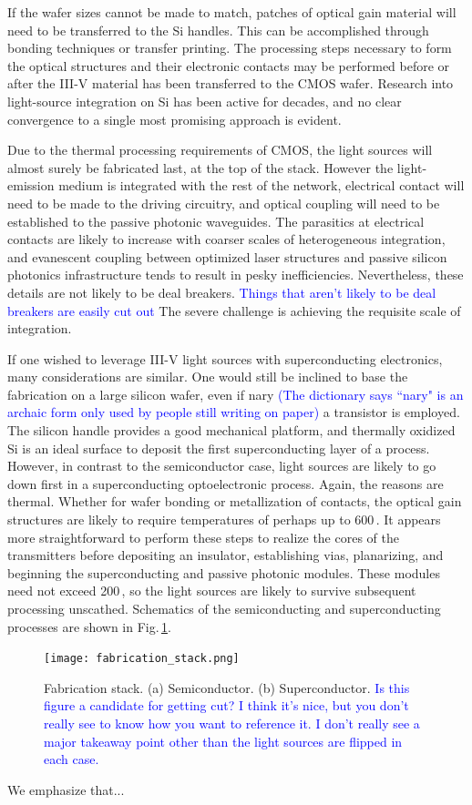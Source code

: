\documentclass[twocolumn]{article}
\begin{document}
If the wafer sizes cannot be made to match, patches of optical gain material will need to be transferred to the Si handles. This can be accomplished through bonding techniques or transfer printing. The processing steps necessary to form the optical structures and their electronic contacts may be performed before or after the III-V material has been transferred to the CMOS wafer. Research into light-source integration on Si has been active for decades, and no clear convergence to a single most promising approach is evident.

Due to the thermal processing requirements of CMOS, the light sources will almost surely be fabricated last, at the top of the stack. However the light-emission medium is integrated with the rest of the network, electrical contact will need to be made to the driving circuitry, and optical coupling will need to be established to the passive photonic waveguides. The parasitics at electrical contacts are likely to increase with coarser scales of heterogeneous integration, and evanescent coupling between optimized laser structures and passive silicon photonics infrastructure tends to result in pesky inefficiencies. Nevertheless, these details are not likely to be deal breakers. \textcolor{blue}{Things that aren't likely to be deal breakers are easily cut out} The severe challenge is achieving the requisite scale of integration.

If one wished to leverage III-V light sources with superconducting electronics, many considerations are similar. One would still be inclined to base the fabrication on a large silicon wafer, even if nary \textcolor{blue}{(The dictionary says ``nary" is an archaic form only used by people still writing on paper)} a transistor is employed. The silicon handle provides a good mechanical platform, and thermally oxidized Si is an ideal surface to deposit the first superconducting layer of a process. However, in contrast to the semiconductor case, light sources are likely to go down first in a superconducting optoelectronic process. Again, the reasons are thermal. Whether for wafer bonding or metallization of contacts, the optical gain structures are likely to require temperatures of perhaps up to 600\,\textcelsius. It appears more straightforward to perform these steps to realize the cores of the transmitters before depositing an insulator, establishing vias, planarizing, and beginning the superconducting and passive photonic modules. These modules need not exceed 200\,\textcelsius, so the light sources are likely to survive subsequent processing unscathed. Schematics of the semiconducting and superconducting processes are shown in Fig.\,\ref{fig:fabrication_stack}.
\begin{figure}[t!]
    \centering
    \texttt{[image: fabrication\_stack.png]}
    \caption{Fabrication stack. (a) Semiconductor. (b) Superconductor. \textcolor{blue}{Is this figure a candidate for getting cut? I think it's nice, but you don't really see to know how you want to reference it. I don't really see a major takeaway point other than the light sources are flipped in each case.}}
    \label{fig:fabrication_stack}
\end{figure}
We emphasize that...
\end{document}
